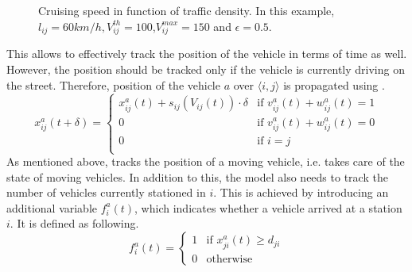\begin{figure}[t]
	\centering
	\caption[Cruising speed in function of traffic density]{Cruising speed in function of traffic density. In this example, $l_{ij} = 60 km/h,V_{ij}^{th} = 100$,$V_{ij}^{max} = 150$ and $\epsilon = 0.5$.  }
	\label{fig:speed_model}
\end{figure}
This allows to effectively track the position of the vehicle in terms of time as well. However, the position should be tracked only if the vehicle is currently driving on the street. 
Therefore, position of the vehicle $a$ over $\langle i,j\rangle$ is propagated using . 
\begin{equation}
	x^a_{ij}(t+\delta) =\begin{cases}
		 x^a_{ij}(t) + s_{ij}(V_{ij}(t))\cdot\delta & \text{if } v^a_{ij}(t) + w^a_{ij}(t)= 1 \\
		 
		 0& \text{if } v^a_{ij}(t) + w^a_{ij}(t)= 0\\
		 0& \text{if }i=j \\
	\end{cases}
	 \label{eq:position_propagation}
\end{equation}
As mentioned above,  tracks the position of a moving vehicle, i.e. takes care of the state of moving vehicles. In addition to this, the model also needs to track the number of vehicles currently stationed in $i$. This is achieved by introducing an additional variable $f^a_i(t)$, which indicates whether a vehicle arrived at a station $i$. It is defined as following.
\begin{equation}
	f^a_{i}(t) =\begin{cases}
		1 & \text{if }x^a_{ji}(t) \ge d_{ji}\\
		0 & \text{otherwise}
	\end{cases}
	\label{eq:station_propagation}
\end{equation}
